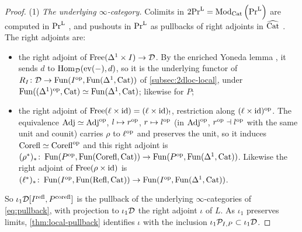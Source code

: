 \begin{proof}
%
(1) \emph{The underlying $\infty$-category.}
Colimits in
$\operatorname{2Pr}^{\operatorname{L}} = {\operatorname{Mod}_{\mathrm{Cat}}\left(\operatorname{Pr}^{\operatorname{L}}\right)}$
are computed in $\operatorname{Pr}^{\operatorname{L}}$ \cite[4.2.3.5]{ha},
and pushouts in $\operatorname{Pr}^{\operatorname{L}}$ as pullbacks of right adjoints in $\widehat{\mathrm{Cat}}$
\cite[5.5.3.4, 5.5.3.18]{htt}. The right adjoints are:
\begin{itemize}
\item the right adjoint of
$\operatorname{Free}(\Delta^{1} \times I) \to \mathcal{D}$.
By the enriched Yoneda lemma \cite{hinich2020yoneda,heine2023enriched},
it sends $d$ to
$\operatorname{Hom}_{\mathcal{D}}(\mathrm{ev}(-),d)$,
so it is the underlying functor of
$R_{I}\colon \mathcal{D} \to \operatorname{Fun}(I^{\mathrm{op}},\operatorname{Fun}(\Delta^{1},\mathrm{Cat}))$
of \cref{subsec:2dloc-local}, under
$\operatorname{Fun}((\Delta^{1})^{\mathrm{op}},\mathrm{Cat}) \simeq \operatorname{Fun}(\Delta^{1},\mathrm{Cat})$;
likewise for $P$;
\item the right adjoint of
$\operatorname{Free}(\ell \times \mathrm{id}) = (\ell \times \mathrm{id})_{!}$,
restriction along
$(\ell \times \mathrm{id})^{\mathrm{op}}$.
The equivalence
$\mathrm{Adj} \simeq \mathrm{Adj}^{\mathrm{op}}$,
$l \mapsto r^{\mathrm{op}}$, $r \mapsto l^{\mathrm{op}}$ (in $\mathrm{Adj}^{\mathrm{op}}$,
$r^{\mathrm{op}} \dashv l^{\mathrm{op}}$
with the same unit and counit) carries $\rho$ to $\ell^{\mathrm{op}}$ and preserves the
unit, so it induces
$\mathrm{Corefl} \simeq \mathrm{Corefl}^{\mathrm{op}}$
and this right adjoint is
$(\rho^{*})_{*}\colon \operatorname{Fun}(P^{\mathrm{op}},\operatorname{Fun}(\mathrm{Corefl},\mathrm{Cat})) \to
\operatorname{Fun}(P^{\mathrm{op}},\operatorname{Fun}(\Delta^{1},\mathrm{Cat}))$.
Likewise the right adjoint of
$\operatorname{Free}(\rho \times \mathrm{id})$
is
$(\ell^{*})_{*}\colon \operatorname{Fun}(I^{\mathrm{op}},\operatorname{Fun}(\mathrm{Refl},\mathrm{Cat})) \to
\operatorname{Fun}(I^{\mathrm{op}},\operatorname{Fun}(\Delta^{1},\mathrm{Cat}))$.
\end{itemize}
So
$\iota_{1}\mathcal{D}[{I}^{\mathrm{refl}},{P}^{\mathrm{corefl}}]$
is the pullback of the underlying $\infty$-categories of \eqref{eq:pullback},
with projection to $\iota_{1}\mathcal{D}$ the right adjoint $\iota$ of $L$.
As $\iota_{1}$ preserves limits, \cref{thm:local-pullback} identifies $\iota$
with the inclusion
$\iota_{1}\mathcal{P}_{I,P} \subset \iota_{1}\mathcal{D}$.


\end{proof}
